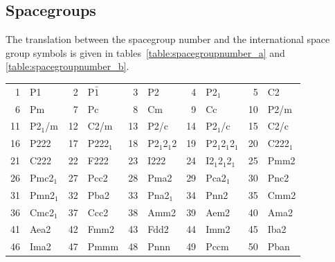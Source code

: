 \documentclass[final,12pt,makeidx,DIV=calc]{article}
\begin{document}
{{{%
\newpage
\subsection{Spacegroups}
The translation between the spacegroup number and the international
space group symbols is given in tables~\ref{table:spacegroupnumber_a}
and \ref{table:spacegroupnumber_b}.
\begin{table}[h!]
\begin{center}
\begin{tabular}{||r|l||r|l||r|l||r|l||r|l||}
\hline
1      & P1                 & 
2      & P$\bar{1}$         & 
3      & P2                 & 
4      & P2$_1$             & 
5      & C2                 \\
6      & Pm                 & 
7      & Pc                 & 
8      & Cm                 & 
9      & Cc                 & 
10     & P2/m               \\
11     & P2$_1$/m           & 
12     & C2/m               & 
13     & P2/c               & 
14     & P2$_1$/c           & 
15     & C2/c               \\
16     & P222               & 
17     & P222$_1$           & 
18     & P2$_1$2$_1$2       & 
19     & P2$_1$2$_1$2$_1$   & 
20     & C222$_1$           \\
21     & C222               & 
22     & F222               & 
23     & I222               & 
24     & I2$_1$2$_1$2$_1$   & 
25     & Pmm2               \\
26     & Pmc2$_1$           & 
27     & Pcc2               & 
28     & Pma2               & 
29     & Pca2$_1$           & 
30     & Pnc2               \\
31     & Pmn2$_1$           & 
32     & Pba2               & 
33     & Pna2$_1$           & 
34     & Pnn2               & 
35     & Cmm2               \\
36     & Cmc2$_1$           & 
37     & Ccc2               & 
38     & Amm2               & 
39     & Aem2               & 
40     & Ama2               \\
41     & Aea2               & 
42     & Fmm2               & 
43     & Fdd2               & 
44     & Imm2               & 
45     & Iba2               \\
46     & Ima2               & 
47     & Pmmm               & 
48     & Pnnn               & 
49     & Pccm               & 
50     & Pban               \\

\end{tabular}
\end{center}
\end{table}}}}
\end{document}
